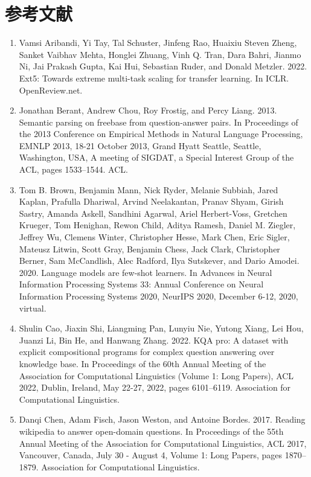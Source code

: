 \documentclass[11pt,UTF8,fontset=fandol]{ctexart}
\begin{document}
\section*{参考文献}
\begin{enumerate}[leftmargin=2em]
\item Vamsi Aribandi, Yi Tay, Tal Schuster, Jinfeng Rao, Huaixiu Steven Zheng, Sanket Vaibhav Mehta, Honglei Zhuang, Vinh Q. Tran, Dara Bahri, Jianmo Ni, Jai Prakash Gupta, Kai Hui, Sebastian Ruder, and Donald Metzler. 2022. Ext5: Towards extreme multi-task scaling for transfer learning. In ICLR. OpenReview.net.
\item Jonathan Berant, Andrew Chou, Roy Frostig, and Percy Liang. 2013. Semantic parsing on freebase from question-answer pairs. In Proceedings of the 2013 Conference on Empirical Methods in Natural Language Processing, EMNLP 2013, 18-21 October 2013, Grand Hyatt Seattle, Seattle, Washington, USA, A meeting of SIGDAT, a Special Interest Group of the ACL, pages 1533--1544. ACL.
\item Tom B. Brown, Benjamin Mann, Nick Ryder, Melanie Subbiah, Jared Kaplan, Prafulla Dhariwal, Arvind Neelakantan, Pranav Shyam, Girish Sastry, Amanda Askell, Sandhini Agarwal, Ariel Herbert-Voss, Gretchen Krueger, Tom Henighan, Rewon Child, Aditya Ramesh, Daniel M. Ziegler, Jeffrey Wu, Clemens Winter, Christopher Hesse, Mark Chen, Eric Sigler, Mateusz Litwin, Scott Gray, Benjamin Chess, Jack Clark, Christopher Berner, Sam McCandlish, Alec Radford, Ilya Sutskever, and Dario Amodei. 2020. Language models are few-shot learners. In Advances in Neural Information Processing Systems 33: Annual Conference on Neural Information Processing Systems 2020, NeurIPS 2020, December 6-12, 2020, virtual.
\item Shulin Cao, Jiaxin Shi, Liangming Pan, Lunyiu Nie, Yutong Xiang, Lei Hou, Juanzi Li, Bin He, and Hanwang Zhang. 2022. KQA pro: A dataset with explicit compositional programs for complex question answering over knowledge base. In Proceedings of the 60th Annual Meeting of the Association for Computational Linguistics (Volume 1: Long Papers), ACL 2022, Dublin, Ireland, May 22-27, 2022, pages 6101--6119. Association for Computational Linguistics.
\item Danqi Chen, Adam Fisch, Jason Weston, and Antoine Bordes. 2017. Reading wikipedia to answer open-domain questions. In Proceedings of the 55th Annual Meeting of the Association for Computational Linguistics, ACL 2017, Vancouver, Canada, July 30 - August 4, Volume 1: Long Papers, pages 1870--1879. Association for Computational Linguistics.

\end{enumerate}
\end{document}
